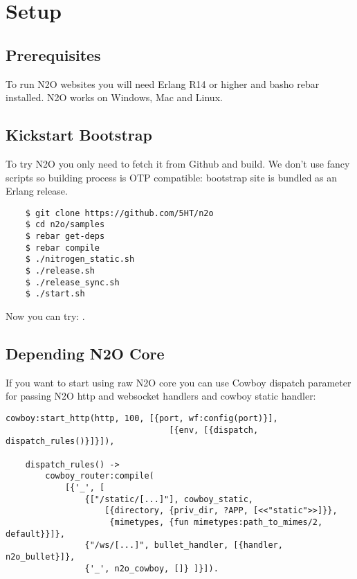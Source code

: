 \section{Setup}

\subsection{Prerequisites}
To run N2O websites you will need Erlang R14 or higher and basho rebar installed.
N2O works on Windows, Mac and Linux.

\subsection{Kickstart Bootstrap}
To try N2O you only need to fetch it from Github and build. We don't use
fancy scripts so building process is OTP compatible: bootstrap site
is bundled as an Erlang release.

\vspace{1\baselineskip}
\begin{lstlisting}
    $ git clone https://github.com/5HT/n2o
    $ cd n2o/samples
    $ rebar get-deps
    $ rebar compile
    $ ./nitrogen_static.sh
    $ ./release.sh
    $ ./release_sync.sh
    $ ./start.sh
\end{lstlisting}
\vspace{1\baselineskip}

Now you can try: .

\newpage
\subsection{Depending N2O Core}
If you want to start using raw N2O core you can use Cowboy dispatch parameter
for passing N2O http and websocket handlers and cowboy static handler:

\begin{lstlisting}[caption=web\_sup.erl]
    cowboy:start_http(http, 100, [{port, wf:config(port)}],
                                 [{env, [{dispatch, dispatch_rules()}]}]),

    dispatch_rules() ->
        cowboy_router:compile(
            [{'_', [
                {["/static/[...]"], cowboy_static,
                    [{directory, {priv_dir, ?APP, [<<"static">>]}},
                     {mimetypes, {fun mimetypes:path_to_mimes/2, default}}]}, 
                {"/ws/[...]", bullet_handler, [{handler, n2o_bullet}]},
                {'_', n2o_cowboy, []} ]}]).
\end{lstlisting}

